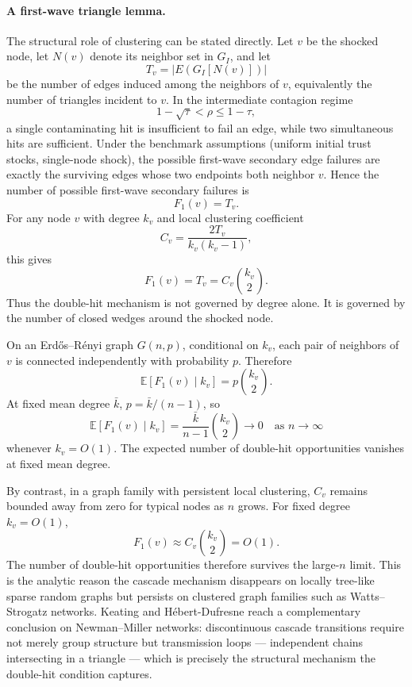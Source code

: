 \documentclass[11pt,a4paper]{article}
\begin{document}
\paragraph{A first-wave triangle lemma.}
The structural role of clustering can be stated directly. Let $v$ be the shocked node, let $N(v)$ denote its neighbor set in $G_I$, and let
\[
T_v = |E(G_I[N(v)])|
\]
be the number of edges induced among the neighbors of $v$, equivalently the number of triangles incident to $v$. In the intermediate contagion regime
\[
1 - \sqrt{\tau} < \rho \leq 1 - \tau,
\]
a single contaminating hit is insufficient to fail an edge, while two simultaneous hits are sufficient. Under the benchmark assumptions (uniform initial trust stocks, single-node shock), the possible first-wave secondary edge failures are exactly the surviving edges whose two endpoints both neighbor $v$. Hence the number of possible first-wave secondary failures is
\[
F_1(v) = T_v.
\]
For any node $v$ with degree $k_v$ and local clustering coefficient
\[
C_v = \frac{2 T_v}{k_v(k_v - 1)},
\]
this gives
\begin{equation}
F_1(v) = T_v = C_v \binom{k_v}{2}.
\end{equation}
Thus the double-hit mechanism is not governed by degree alone. It is governed by the number of closed wedges around the shocked node.

On an Erd\H{o}s--R\'enyi graph $G(n,p)$, conditional on $k_v$, each pair of neighbors of $v$ is connected independently with probability $p$. Therefore
\[
\mathbb{E}[F_1(v) \mid k_v] = p \binom{k_v}{2}.
\]
At fixed mean degree $\bar{k}$, $p = \bar{k}/(n-1)$, so
\[
\mathbb{E}[F_1(v) \mid k_v] = \frac{\bar{k}}{n-1} \binom{k_v}{2} \longrightarrow 0 \quad \text{as } n \to \infty
\]
whenever $k_v = O(1)$. The expected number of double-hit opportunities vanishes at fixed mean degree.

By contrast, in a graph family with persistent local clustering, $C_v$ remains bounded away from zero for typical nodes as $n$ grows. For fixed degree $k_v = O(1)$,
\[
F_1(v) \approx C_v \binom{k_v}{2} = O(1).
\]
The number of double-hit opportunities therefore survives the large-$n$ limit. This is the analytic reason the cascade mechanism disappears on locally tree-like sparse random graphs but persists on clustered graph families such as Watts--Strogatz networks. Keating and H\'ebert-Dufresne \cite{keating2025} reach a complementary conclusion on Newman--Miller networks: discontinuous cascade transitions require not merely group structure but transmission loops --- independent chains intersecting in a triangle --- which is precisely the structural mechanism the double-hit condition captures.
\end{document}
